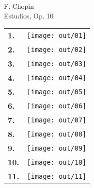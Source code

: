 \documentclass[a4paper,13pt,oneside,headinclude,titlepage]{article} %
\newcommand{\imgw}{0.67}
\newlength{\colw}
\newcommand{\tn}{\tabularnewline}
\begin{document}
\begin{center}
\vfill
{\huge F. Chopin}\\[1ex]
{\huge Estudios, Op. 10}\\[1ex]
\vfill
\begin{tabular}{>{\bfseries}m{2ex}m{\colw}}
1.&\texttt{[image: out/01]}\tn
2.&\texttt{[image: out/02]}\tn
3.&\texttt{[image: out/03]}\tn
4.&\texttt{[image: out/04]}\tn
5.&\texttt{[image: out/05]}\tn
6.&\texttt{[image: out/06]}\tn
7.&\texttt{[image: out/07]}\tn
8.&\texttt{[image: out/08]}\tn
9.&\texttt{[image: out/09]}\tn
10.&\texttt{[image: out/10]}\tn
11.&\texttt{[image: out/11]}\tn
\end{tabular}
\end{center}
\vfill
\end{document}

